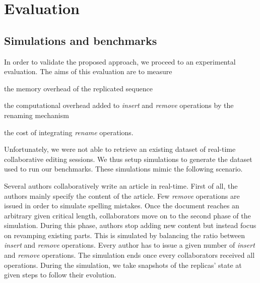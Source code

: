 \documentclass[10pt,journal,compsoc]{IEEEtran}
\begin{document}
\section{Evaluation}

\label{sec:evaluation}

\subsection{Simulations and benchmarks}

In order to validate the proposed approach, we proceed to an experimental evaluation.
The aims of this evaluation are to measure
\begin{enumerate*}[label=(\roman*)]
    \item the memory overhead of the replicated sequence
    \item the computational overhead added to \emph{insert} and \emph{remove} operations by the renaming mechanism
    \item the cost of integrating \emph{rename} operations.
\end{enumerate*}

Unfortunately, we were not able to retrieve an existing dataset of real-time collaborative editing sessions.
We thus setup simulations to generate the dataset used to run our benchmarks.
These simulations mimic the following scenario.

Several authors collaboratively write an article in real-time.
First of all, the authors mainly specify the content of the article.
Few \emph{remove} operations are issued in order to simulate spelling mistakes.
Once the document reaches an arbitrary given critical length, collaborators move on to the second phase of the simulation.
During this phase, authors stop adding new content but instead focus on revamping existing parts.
This is simulated by balancing the ratio between \emph{insert} and \emph{remove} operations.
Every author has to issue a given number of \emph{insert} and \emph{remove} operations.
The simulation ends once every collaborators received all operations.
During the simulation, we take snapshots of the replicas' state at given steps to follow their evolution.
\end{document}
